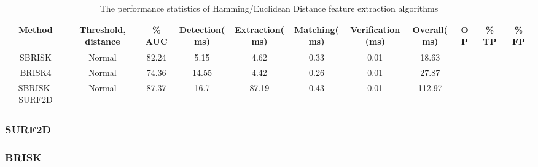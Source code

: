 \documentclass{article}
\begin{document}
\begin{table}
\caption{The performance statistics of Hamming/Euclidean Distance feature extraction algorithms}
\begin{tabular}{|c|c|c|c|c|c|c|c|c|c|c|}
\hline 
Method & Threshold, distance & \% AUC & Detection(ms) & Extraction(ms) & Matching(ms) & Verification(ms) & Overall(ms) & OP & \% TP & \% FP\tabularnewline
\hline 
\hline 
SBRISK & Normal & 82.24 & 5.15 & 4.62 & 0.33 & 0.01 & 18.63 &  &  & \tabularnewline
\hline 
BRISK4 & Normal & 74.36 & 14.55 & 4.42 & 0.26 & 0.01 & 27.87 &  &  & \tabularnewline
\hline 
SBRISK-SURF2D & Normal & 87.37 & 16.7 & 87.19 & 0.43 & 0.01 & 112.97 &  &  & \tabularnewline
\hline 
\end{tabular}
\label{tab:hammingStatistics}
\end{table}





\subsubsection{SURF2D}
\label{sec:2dsurfResults}

\subsubsection{BRISK}
\label{sec:briskResults}


\end{document}
